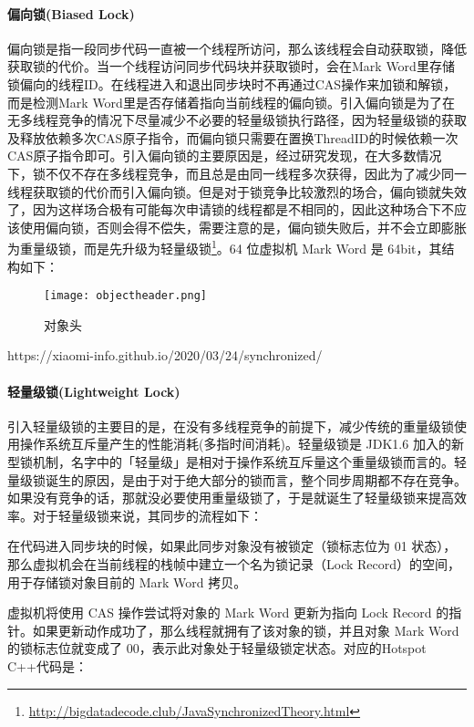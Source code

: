 \documentclass[../../../interview-questions.tex]{subfiles}
\begin{document}
\paragraph{偏向锁(Biased Lock)}偏向锁是指一段同步代码一直被一个线程所访问，那么该线程会自动获取锁，降低获取锁的代价。当一个线程访问同步代码块并获取锁时，会在Mark Word里存储锁偏向的线程ID。在线程进入和退出同步块时不再通过CAS操作来加锁和解锁，而是检测Mark Word里是否存储着指向当前线程的偏向锁。引入偏向锁是为了在无多线程竞争的情况下尽量减少不必要的轻量级锁执行路径，因为轻量级锁的获取及释放依赖多次CAS原子指令，而偏向锁只需要在置换ThreadID的时候依赖一次CAS原子指令即可。引入偏向锁的主要原因是，经过研究发现，在大多数情况下，锁不仅不存在多线程竞争，而且总是由同一线程多次获得，因此为了减少同一线程获取锁的代价而引入偏向锁。但是对于锁竞争比较激烈的场合，偏向锁就失效了，因为这样场合极有可能每次申请锁的线程都是不相同的，因此这种场合下不应该使用偏向锁，否则会得不偿失，需要注意的是，偏向锁失败后，并不会立即膨胀为重量级锁，而是先升级为轻量级锁\footnote{\url{http://bigdatadecode.club/JavaSynchronizedTheory.html}}。64 位虚拟机 Mark Word 是 64bit，其结构如下：

\begin{figure}[htbp]
	\centering
	\texttt{[image: objectheader.png]}
	\caption{对象头}
	\label{fig:objectheader}
\end{figure}

https://xiaomi-info.github.io/2020/03/24/synchronized/

\paragraph{轻量级锁(Lightweight Lock)}
引入轻量级锁的主要目的是，在没有多线程竞争的前提下，减少传统的重量级锁使用操作系统互斥量产生的性能消耗(多指时间消耗)。轻量级锁是 JDK1.6 加入的新型锁机制，名字中的「轻量级」是相对于操作系统互斥量这个重量级锁而言的。轻量级锁诞生的原因，是由于对于绝大部分的锁而言，整个同步周期都不存在竞争。如果没有竞争的话，那就没必要使用重量级锁了，于是就诞生了轻量级锁来提高效率。对于轻量级锁来说，其同步的流程如下：

在代码进入同步块的时候，如果此同步对象没有被锁定（锁标志位为 01 状态），那么虚拟机会在当前线程的栈帧中建立一个名为锁记录（Lock Record）的空间，用于存储锁对象目前的 Mark Word 拷贝。

虚拟机将使用 CAS 操作尝试将对象的 Mark Word 更新为指向 Lock Record 的指针。如果更新动作成功了，那么线程就拥有了该对象的锁，并且对象 Mark Word 的锁标志位就变成了 00，表示此对象处于轻量级锁定状态。对应的Hotspot C++代码是：
\end{document}
